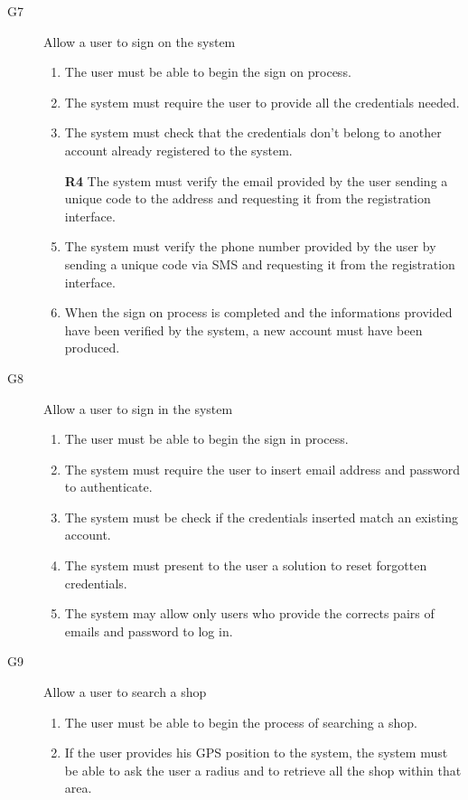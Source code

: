 \begin{description}
\begin{enumerate}[resume*]
        \end{enumerate}
    \item [G7] Allow a user to sign on the system
        \begin{enumerate}[resume*]
            \item The user must be able to begin the sign on process.
            \item The system must require the user to provide all the credentials needed.
            \item The system must check that the credentials don't belong to another account already registered to the system.
            \item[\textbf{R4}] The system must verify the email provided by the user sending a unique code to the address and requesting it from the registration interface.
            \item The system must verify the phone number provided by the user by sending a unique code via SMS and requesting it from the registration interface.
            \item When the sign on process is completed and the informations provided have been verified by the system, a new account must have been produced.
        \end{enumerate}
    \item [G8] Allow a user to sign in the system
        \begin{enumerate}[resume*]
            \item The user must be able to begin the sign in process.
            \item The system must require the user to insert email address and password to authenticate.
            \item The system must be check if the credentials inserted match an existing account.
            \item The system must present to the user a solution to reset forgotten credentials.
            \item The system may allow only users who provide the corrects pairs of emails and password to log in.
        \end{enumerate}
    \item [G9] Allow a user to search a shop
        \begin{enumerate}[resume*]
            \item The user must be able to begin the process of searching a shop.
            \item If the user provides his GPS position to the system, the system must be able to ask the user a radius and to retrieve all the shop within that area.

\end{enumerate}
\end{description}
